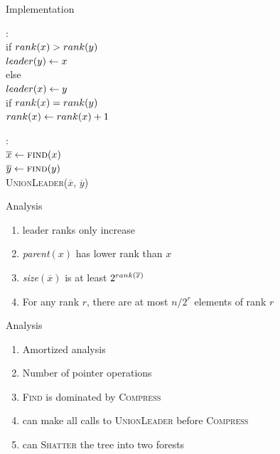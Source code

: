 \documentclass[aspectratio=169]{beamer}
\begin{document}
\begin{frame}{Implementation}
	\begin{minipage}{0.6\textwidth}
		\onslide<+->
		\begin{algo}
			: \+
			\\ if $ \emph{rank}(x) > \emph{rank}(y) $ \+
			\\ $\emph{leader}(y) \gets x$ \-
			\\ else \+
			\\ $\emph{leader}(x) \gets y$
			\\ if $ \emph{rank}(x) = \emph{rank}(y) $ \+
			\\ $\emph{rank}(x) \gets \emph{rank}(x) + 1$
		\end{algo}
	\end{minipage}
	\begin{minipage}{0.38\textwidth}
		\onslide<+->
		\begin{algo}
			\textul{\textsc{Union}($x$, $y$)}: \+
			\\ $\overline{x} \gets \textsc{find}(x)$
			\\ $\overline{y} \gets \textsc{find}(y)$
			\\ \textsc{UnionLeader}($\overline{x}$, $\overline{y}$)
		\end{algo}
	\end{minipage}
\end{frame}

\begin{frame}{Analysis}
	\begin{enumerate}  \onslide<+->
		\item leader ranks only increase \onslide<+->
		\item \emph{parent}$(x)$ has lower rank than $x$ \onslide<+->
		\item \emph{size}$(\overline{x})$ is at least $2^{\emph{rank}(\overline{x})}$\onslide<+->
		\item For any rank $r$, there are at most $n/2^r$ elements of rank $r$
	\end{enumerate}
\end{frame}

\begin{frame}{Analysis}
	\begin{enumerate}\onslide<+->
		\item Amortized analysis \onslide<+->
		\item Number of pointer operations \onslide<+->
		\item \textsc{Find} is dominated by \textsc{Compress}\onslide<+->
		\item can make all calls to \textsc{UnionLeader} before \textsc{Compress}\onslide<+->
		\item can \textsc{Shatter} the tree into two forests
	\end{enumerate}
\end{frame}
\end{document}
